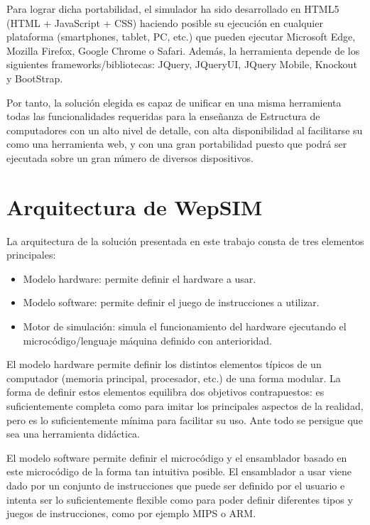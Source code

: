 Para lograr dicha portabilidad, el simulador ha sido desarrollado en HTML5 (HTML + JavaScript + CSS) haciendo posible su ejecución en cualquier plataforma (smartphones, tablet, PC, etc.) que pueden ejecutar Microsoft Edge, Mozilla Firefox, Google Chrome o Safari. Además, la herramienta depende de los siguientes frameworks/bibliotecas: JQuery, JQueryUI, JQuery Mobile, Knockout y BootStrap.

Por tanto, la solución elegida es capaz de unificar en una misma herramienta todas las funcionalidades requeridas para la enseñanza de Estructura de computadores con un alto nivel de detalle, con alta disponibilidad al facilitarse su como una herramienta web, y con una gran portabilidad puesto que podrá ser ejecutada sobre un gran número de diversos dispositivos.



\section{Arquitectura de WepSIM}
\label{sec:simulator_architecture}

La arquitectura de la solución presentada en este trabajo consta de tres elementos principales:

\begin{itemize}
\item Modelo hardware: permite definir el hardware a usar.
\item Modelo software: permite definir el juego de instrucciones a utilizar.
\item Motor de simulación: simula el funcionamiento del hardware ejecutando el microcódigo/lenguaje máquina definido con anterioridad.
\end{itemize}

El modelo hardware permite definir los distintos elementos típicos de un computador (memoria principal, procesador, etc.) de una forma modular. La forma de definir estos elementos equilibra dos objetivos contrapuestos: es suficientemente completa como para imitar los principales aspectos de la realidad, pero es lo suficientemente mínima para facilitar su uso. Ante todo se persigue que sea una herramienta didáctica.

El modelo software permite definir el microcódigo y el ensamblador basado en este microcódigo de la forma tan intuitiva posible. El ensamblador a usar viene dado por un conjunto de instrucciones que puede ser definido por el usuario e intenta ser lo suficientemente flexible como para poder definir diferentes tipos y juegos de instrucciones, como por ejemplo MIPS o ARM.


